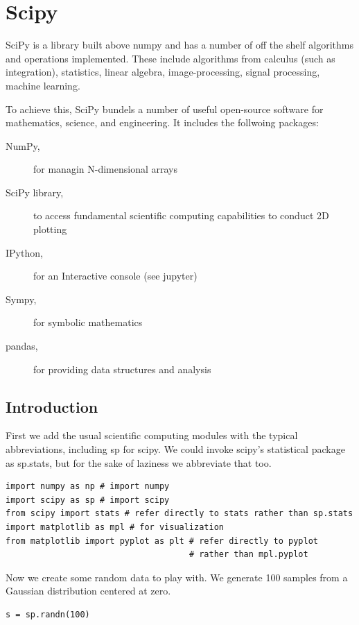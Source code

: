 \chapter{Scipy}
\label{c:scipy}

SciPy is a library built above numpy and has a number of off the shelf
algorithms and operations implemented. These include algorithms from
calculus (such as integration), statistics, linear algebra,
image-processing, signal processing, machine learning.

To achieve this, SciPy bundels a number of useful open-source software
for mathematics, science, and engineering. It includes the follwoing
packages:

\begin{description}

\item[NumPy,] for managin N-dimensional arrays
\item[SciPy library,] to access fundamental scientific computing capabilities
\iten[Matplotlib,] to conduct 2D plotting
\item[IPython,] for an Interactive console (see jupyter)
\item[Sympy,] for symbolic mathematics
\item[pandas,] for providing data structures and analysis

\end{description}


\section{Introduction}

First we add the usual scientific computing modules with the typical
abbreviations, including sp for scipy. We could invoke scipy's
statistical package as sp.stats, but for the sake of laziness we
abbreviate that too.

\begin{verbatim}
import numpy as np # import numpy
import scipy as sp # import scipy
from scipy import stats # refer directly to stats rather than sp.stats
import matplotlib as mpl # for visualization
from matplotlib import pyplot as plt # refer directly to pyplot 
                                     # rather than mpl.pyplot
\end{verbatim}

Now we create some random data to play with. We generate 100 samples
from a Gaussian distribution centered at zero.

\begin{verbatim}
s = sp.randn(100)
\end{verbatim}

